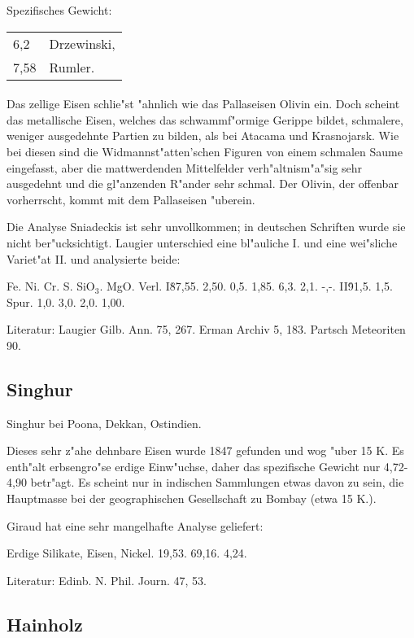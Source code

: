 \documentclass[a4paper, 11pt, oneside]{article}
\begin{document}
Spezifisches Gewicht:  
\begin{table}[!ht]
    \centering
    \begin{tabular}{l l}
        6,2 & Drzewinski,\\
        7,58 & Rumler.
    \end{tabular}
\end{table}
\paragraph{}
Das zellige Eisen schlie"st "ahnlich wie das Pallaseisen Olivin ein. Doch scheint das metallische Eisen, welches das schwammf"ormige Gerippe bildet, schmalere, weniger ausgedehnte Partien zu bilden, als bei Atacama und Krasnojarsk. Wie bei diesen sind die Widmannst"atten'schen Figuren von einem schmalen Saume eingefasst, aber die mattwerdenden Mittelfelder verh"altnism"a"sig sehr ausgedehnt und die gl"anzenden R"ander sehr schmal. Der Olivin, der offenbar vorherrscht, kommt mit dem Pallaseisen "uberein.

Die Analyse Sniadeckis ist sehr unvollkommen; in deutschen Schriften wurde sie nicht ber"ucksichtigt. Laugier unterschied eine bl"auliche I. und eine wei"sliche Variet"at II. und analysierte beide:

Fe. Ni. Cr. S. SiO$_{3}$. MgO. Verl.  
I\. 87,55. 2,50. 0,5. 1,85. 6,3. 2,1. -,-.  
II\. 91,5. 1,5. Spur. 1,0. 3,0. 2,0. 1,00.

Literatur: Laugier Gilb. Ann. 75, 267. Erman Archiv 5, 183. Partsch Meteoriten 90.

\subsection{Singhur}

Singhur bei Poona, Dekkan, Ostindien.

Dieses sehr z"ahe dehnbare Eisen wurde 1847 gefunden und wog "uber 15 K. Es enth"alt erbsengro"se erdige Einw"uchse, daher das spezifische Gewicht nur 4,72-4,90 betr"agt. Es scheint nur in indischen Sammlungen etwas davon zu sein, die Hauptmasse bei der geographischen Gesellschaft zu Bombay (etwa 15 K.).

Giraud hat eine sehr mangelhafte Analyse geliefert:

Erdige Silikate, Eisen, Nickel.  
19,53. 69,16. 4,24.

Literatur: Edinb. N. Phil. Journ. 47, 53.

\subsection{Hainholz}
\end{document}
